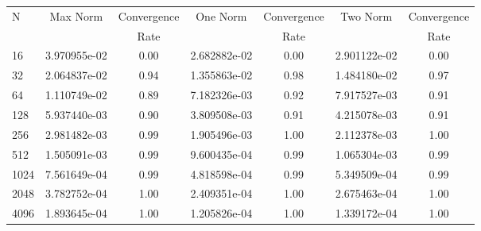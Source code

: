 \documentclass[12pt]{article}
\begin{document}
	\begin{tabular}{l|c|c|c|c|c|c}
		N&Max Norm&Convergence&One Norm&Convergence&Two Norm&Convergence\\
		&&Rate&&Rate&&Rate\\
		\hline
		16&3.970955e-02&0.00&2.682882e-02&0.00&2.901122e-02&0.00\\
		\hline
		32&2.064837e-02&0.94&1.355863e-02&0.98&1.484180e-02&0.97\\
		\hline
		64&1.110749e-02&0.89&7.182326e-03&0.92&7.917527e-03&0.91\\
		\hline
		128&5.937440e-03&0.90&3.809508e-03&0.91&4.215078e-03&0.91\\
		\hline
		256&2.981482e-03&0.99&1.905496e-03&1.00&2.112378e-03&1.00\\
		\hline
		512&1.505091e-03&0.99&9.600435e-04&0.99&1.065304e-03&0.99\\
		\hline
		1024&7.561649e-04&0.99&4.818598e-04&0.99&5.349509e-04&0.99\\
		\hline
		2048&3.782752e-04&1.00&2.409351e-04&1.00&2.675463e-04&1.00\\
		\hline
		4096&1.893645e-04&1.00&1.205826e-04&1.00&1.339172e-04&1.00\\
	\end{tabular}
\end{document}
